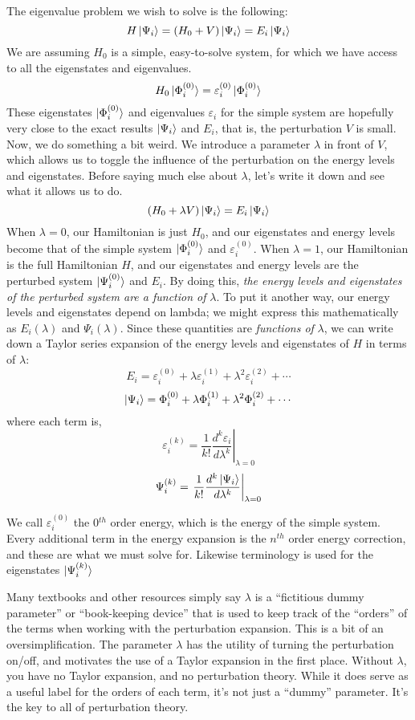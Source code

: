 \documentclass{article}
\newcommand{\eps}{\varepsilon}
\newcommand{\lam}{\lambda}
\begin{document}
The eigenvalue problem we wish to solve is the following:
\[H \ket{\Psi_i} = (H_0 + V) \ket{\Psi_i} = E_i \ket{\Psi_i}\]
We are assuming $H_0$ is a simple, easy-to-solve system, for which we have access to all the eigenstates 
    and eigenvalues.
\[H_0 \ket{\Phi_i^{(0)}} = \eps_i^{(0)} \ket{\Phi_i^{(0)}} \]
These eigenstates $\ket{\Phi_i^{(0)}}$ and eigenvalues $\eps_i$ for the simple system are hopefully very close
    to the exact results  $\ket{\Psi_i}$ and  $E_i$, that is, the perturbation $V$ is small.
Now, we do something a bit weird.
We introduce a parameter $\lam$ in front of $V$, which allows us to toggle the influence of the
    perturbation on the energy levels and eigenstates. 
Before saying much else about $\lam$, let's write it down and see what it allows us to do.
\[(H_0 +  \lam V) \ket{\Psi_i} = E_i \ket{\Psi_i}\]
When $\lam = 0$, our Hamiltonian is just $H_0$, and our eigenstates and energy levels become that 
    of the simple system $\ket{\Phi_i^{(0)}}$ and $ \eps_i^{(0)}$.
When $\lam = 1$, our Hamiltonian is the full Hamiltonian $H$, and our eigenstates and energy levels 
    are the perturbed system $\ket{\Psi_i^{(0)}}$ and $E_i$.
By doing this, \textit{the energy levels and eigenstates of the perturbed system are a function
    of }$\lam$.
To put it another way, our energy levels and eigenstates depend on lambda; 
    we might express this mathematically as  $E_i(\lam)$ and $\Psi_i(\lam)$.
Since these quantities are \textit{functions of} $\lam$, we can write down a Taylor series
expansion of the energy levels and eigenstates of $H$ in terms of $\lam$:
\[E_i =  \eps_i^{(0)} +  \lam \eps_i^{(1)} + \lam^2 \eps_i^{(2)}  + \cdots \]
\[\ket{\Psi_i} =  \Phi_i^{(0)} +  \lam \Phi_i^{(1)} + \lam^2 \Phi_i^{(2)} + \cdots \]
where each term is,  
\[ \eps_i^{(k)} = \left. \frac{1}{k!} \frac{d^k \eps_i}{d \lam^k} \right\rvert_{\lam = 0} \]
\[ \Psi_i^{(k)} = \left. \frac{1}{k!} \frac{d^k \ket{\Psi_i}}{d \lam^k} \right\rvert_{\lam = 0} \]

We call $\eps_i^{(0)}$ the 0$^{th}$ order energy, which is the energy of the simple system. 
Every additional term in the energy expansion is the $n^{th}$ order energy correction, 
    and these are what we must solve for.
Likewise terminology is used for the eigenstates $\ket{\Psi_i^{(k)}}$


Many textbooks and other resources simply say $\lam$ is a 
    ``fictitious dummy parameter'' or ``book-keeping device'' that is 
    used to keep track of the  ``orders'' of the terms when working with the perturbation expansion.
This is a bit of an oversimplification. The parameter $\lam$ has the utility of turning
the perturbation on/off, and motivates the use of a Taylor expansion in the first place.
Without $\lam$, you have no Taylor expansion, and no perturbation theory. 
While it does serve as a useful label for the orders of each term, it's not just a ``dummy'' parameter. 
It's the key to all of perturbation theory.
\end{document}
